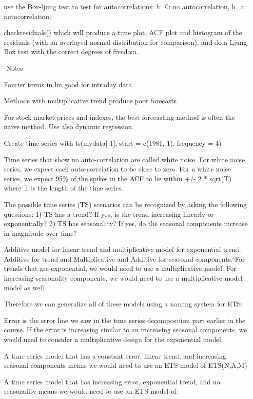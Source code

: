 \documentclass[]{book}
\theoremstyle{definition}
\theoremstyle{definition}
\theoremstyle{definition}
\theoremstyle{remark}
\begin{document}
use the Box-ljung test to test for autocorrelations: h\_0: no
autocorrelation, h\_a: autocorrelation.

checkresiduals() which will produce a time plot, ACF plot and histogram
of the residuals (with an overlayed normal distribution for comparison),
and do a Ljung-Box test with the correct degrees of freedom.

-Notes

Fourier terms in lm good for intraday data.

Methods with multiplicative trend produce poor forecasts.

For stock market prices and indexes, the best forecasting method is
often the naïve method. Use also dynamic regression.

Create time series with ts(mydata{[}-1{]}, start = c(1981, 1), frequency
= 4)

Time series that show no auto-correlation are called white noise. For
white noise series, we expect each auto-correlation to be close to zero.
For a white noise series, we expect 95\% of the spikes in the ACF to lie
within +/- 2 * sqrt(T) where T is the length of the time series.

The possible time series (TS) scenarios can be recognized by asking the
following questions: 1) TS has a trend? If yes, is the trend increasing
linearly or exponentially? 2) TS has seasonality? If yes, do the
seasonal components increase in magnitude over time?

Additive model for linear trend and multiplicative model for exponential
trend. Additive for trend and Multiplicative and Additive for seasonal
components. For trends that are exponential, we would need to use a
multiplicative model. For increasing seasonality components, we would
need to use a multiplicative model model as well.

Therefore we can generalize all of these models using a naming system
for ETS:

Error is the error line we saw in the time series decomposition part
earlier in the course. If the error is increasing similar to an
increasing seasonal components, we would need to consider a
multiplicative design for the exponential model.

A time series model that has a constant error, linear trend, and
increasing seasonal components means we would need to use an ETS model
of ETS(N,A,M)

A time series model that has increasing error, exponential trend, and no
seasonality means we would need to use an ETS model of:
\end{document}
